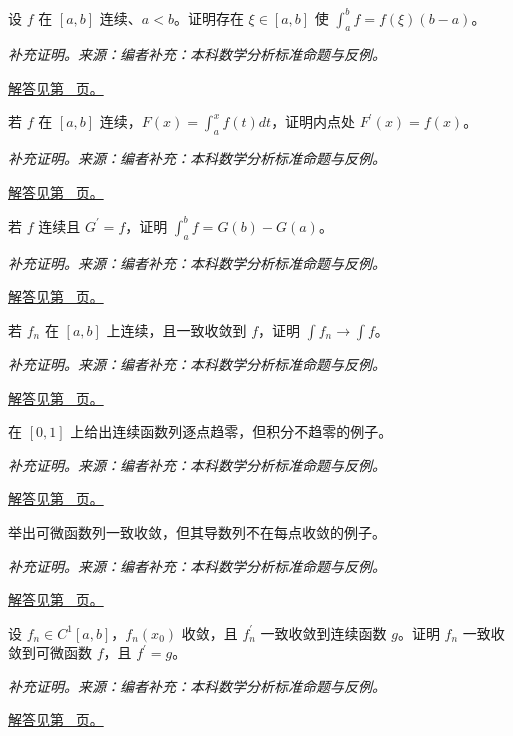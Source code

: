 \documentclass[12pt,fontset=fandol]{ctexart}
\begin{document}
\begin{example}[积分平均值定理]\label{ex:c30q7}
设 $f$ 在 $[a,b]$ 连续、$a<b$。证明存在 $\xi\in[a,b]$ 使 $\int_a^bf=f(\xi)(b-a)$。
\par\textit{补充证明。来源：编者补充：本科数学分析标准命题与反例。}\par\hyperref[ans:c30q7]{解答见第~\pageref{ans:c30q7} 页。}
\end{example}
\begin{example}[基本定理的局部证明]\label{ex:c30q8}
若 $f$ 在 $[a,b]$ 连续，$F(x)=\int_a^xf(t)dt$，证明内点处 $F^{\prime}(x)=f(x)$。
\par\textit{补充证明。来源：编者补充：本科数学分析标准命题与反例。}\par\hyperref[ans:c30q8]{解答见第~\pageref{ans:c30q8} 页。}
\end{example}
\begin{example}\label{ex:c30q9}
若 $f$ 连续且 $G^{\prime}=f$，证明 $\int_a^bf=G(b)-G(a)$。
\par\textit{补充证明。来源：编者补充：本科数学分析标准命题与反例。}\par\hyperref[ans:c30q9]{解答见第~\pageref{ans:c30q9} 页。}
\end{example}
\begin{example}[一致收敛与积分交换]\label{ex:c30q10}
若 $f_n$ 在 $[a,b]$ 上连续，且一致收敛到 $f$，证明 $\int f_n\to\int f$。
\par\textit{补充证明。来源：编者补充：本科数学分析标准命题与反例。}\par\hyperref[ans:c30q10]{解答见第~\pageref{ans:c30q10} 页。}
\end{example}
\begin{example}[逐点收敛不足以交换积分]\label{ex:c30q11}
在 $[0,1]$ 上给出连续函数列逐点趋零，但积分不趋零的例子。
\par\textit{补充证明。来源：编者补充：本科数学分析标准命题与反例。}\par\hyperref[ans:c30q11]{解答见第~\pageref{ans:c30q11} 页。}
\end{example}
\begin{example}[一致收敛不自动保持导数]\label{ex:c30q12}
举出可微函数列一致收敛，但其导数列不在每点收敛的例子。
\par\textit{补充证明。来源：编者补充：本科数学分析标准命题与反例。}\par\hyperref[ans:c30q12]{解答见第~\pageref{ans:c30q12} 页。}
\end{example}
\begin{example}[逐项求导的一个充分条件]\label{ex:c30q13}
设 $f_n\in C^1[a,b]$，$f_n(x_0)$ 收敛，且 $f_n^{\prime}$ 一致收敛到连续函数 $g$。证明 $f_n$ 一致收敛到可微函数 $f$，且 $f^{\prime}=g$。
\par\textit{补充证明。来源：编者补充：本科数学分析标准命题与反例。}\par\hyperref[ans:c30q13]{解答见第~\pageref{ans:c30q13} 页。}
\end{example}
\end{document}
